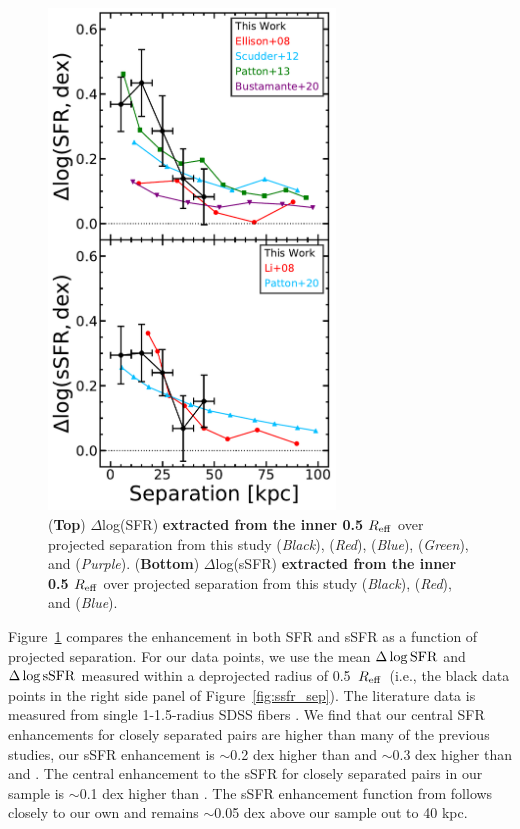 \documentclass[iop,revtex4,twocolumn,apj,numberedappendix,appendixfloats]{emulateapj}
\newcommand{\reff}{$R_{\rm eff}$}
\begin{document}
\begin{figure}
\centering
\includegraphics[width=3in]{fig/nuc_sep.pdf}
\caption[]{(\textbf{Top}) $\Delta$log(SFR) \textbf{extracted from the inner 0.5 \reff} over projected separation from this study ({\it Black}), \citet{Ellison:2008} ({\it Red}), \citet{Scudder:2012} ({\it Blue}), \citet{Patton:2013} ({\it Green}), and \citet{Bustamante:2020} ({\it Purple}). (\textbf{Bottom}) $\Delta$log(sSFR) \textbf{extracted from the inner 0.5 \reff} over projected separation from this study ({\it Black}), \citet{Li:2008} ({\it Red}), and \citet{Patton:2020} ({\it Blue}).}
\label{fig:nuc_sep}
\end{figure}

Figure~\ref{fig:nuc_sep} compares the enhancement in both SFR and sSFR as a function of projected separation. For our data points, we use the mean $\Delta\log{\rm SFR}$ and $\Delta\log{\rm sSFR}$ measured within a deprojected radius of 0.5~\reff\ (i.e., the black data points in the right side panel of Figure~\ref{fig:ssfr_sep}). The literature data is measured from single 1-1.5\arcsec-radius SDSS fibers \citep{Ellison:2008,Scudder:2012,Patton:2013,Bustamante:2020}. We find that our central SFR enhancements for closely separated pairs are higher than many of the previous studies, our sSFR enhancement is $\sim$0.2 dex higher than \citet{Scudder:2012} and $\sim$0.3 dex higher than \citet{Ellison:2008} and \citet{Bustamante:2020}. The central enhancement to the sSFR for closely separated pairs in our sample is $\sim$0.1 dex higher than \citet{Patton:2013}. The sSFR enhancement function from \citet{Li:2008} follows closely to our own and remains $\sim$0.05 dex above our sample out to 40 kpc.  
\end{document}
